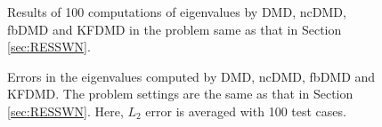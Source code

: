 \documentclass[aip,graphicx]{revtex4-1}
\begin{document}
\begin{figure}
    \caption{Results of 100 computations of eigenvalues by DMD, ncDMD, fbDMD and KFDMD in the problem same as that in Section \ref{sec:RESSWN}.}	
	\label{fig:sinothereigen}
\end{figure}
\begin{figure}
   \caption{Errors in the eigenvalues computed by DMD, ncDMD, fbDMD and KFDMD. The problem settings are the same as that in Section \ref{sec:RESSWN}. Here, $L_2$ error is averaged with 100 test cases. }
   \label{fig:sinothereigenerror}
\end{figure}



\end{document}
